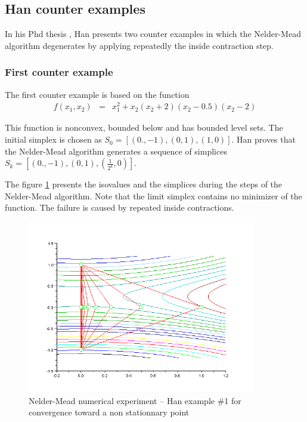 \subsection{Han counter examples}

In his Phd thesis \cite{Han2000}, Han presents two counter examples
in which the Nelder-Mead algorithm degenerates by applying repeatedly
the inside contraction step.

\subsubsection{First counter example}

The first counter example is based on the function 
\begin{eqnarray}
\label{han-function1}
f(x_1,x_2) &=& x_1^2 + x_2 ( x_2 + 2 ) ( x_2 - 0.5 ) ( x_2 - 2 )
\end{eqnarray}

This function is nonconvex, bounded below and has bounded level 
sets. The initial simplex is chosen as $S_0 = [(0.,-1),(0,1),(1,0)]$.
Han proves that the Nelder-Mead algorithm generates a sequence of simplices
$S_k = [(0.,-1),(0,1),(\frac{1}{2^k},0)]$.

The figure \ref{fig-nm-numexp-han1} presents the isovalues and the 
simplices during the steps of the Nelder-Mead algorithm.
Note that the limit simplex contains no minimizer of the function.
The failure is caused by repeated inside contractions.

\begin{figure}
\begin{center}
\includegraphics[width=10cm]{neldermeadmethod/han1-history-simplex.png}
\end{center}
\caption{Nelder-Mead numerical experiment -- Han example \#1 for convergence toward
a non stationnary point}
\label{fig-nm-numexp-han1}
\end{figure}

